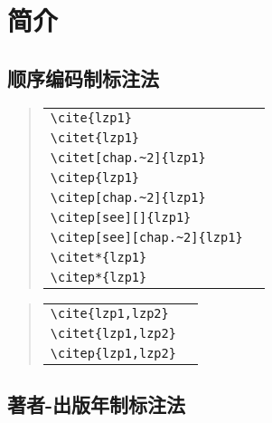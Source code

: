\chapter{简介}

\section{顺序编码制标注法}


\begin{quote}
\begin{tabular}{l@{\quad$\Rightarrow$\quad}l}
  \verb|\cite{lzp1}| & \cite{lzp1}\\
  \verb|\citet{lzp1}| & \citet{lzp1}\\
  \verb|\citet[chap.~2]{lzp1}| & \citet[chap.~2]{lzp1}\\[0.5ex]
  \verb|\citep{lzp1}| & \citep{lzp1}\\
  \verb|\citep[chap.~2]{lzp1}| & \citep[chap.~2]{lzp1}\\
  \verb|\citep[see][]{lzp1}| & \citep[see][]{lzp1}\\
  \verb|\citep[see][chap.~2]{lzp1}| & \citep[see][chap.~2]{lzp1}\\[0.5ex]
  \verb|\citet*{lzp1}| & \citet*{lzp1}\\
  \verb|\citep*{lzp1}| & \citep*{lzp1}
\end{tabular}
\end{quote}
\begin{quote}
\begin{tabular}{l@{\quad$\Rightarrow$\quad}l}
  \verb|\cite{lzp1,lzp2}| & \cite{lzp1,lzp2}\\
  \verb|\citet{lzp1,lzp2}| & \citet{lzp1,lzp2}\\
  \verb|\citep{lzp1,lzp2}| & \citep{lzp1,lzp2}
\end{tabular}
\end{quote}



\section{著者-出版年制标注法}


